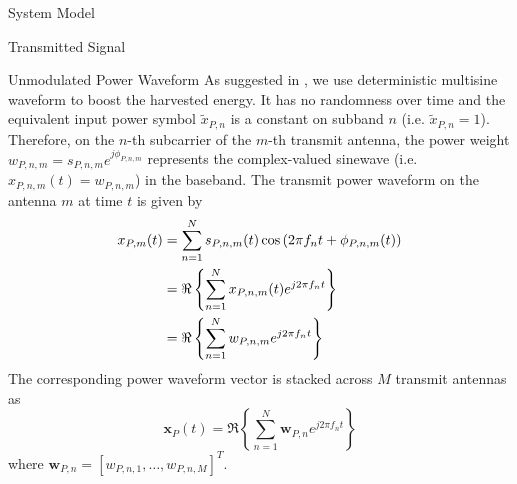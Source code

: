 \documentclass{IEEEtran}
\begin{document}
\begin{section} {System Model}
\begin{subsection} {Transmitted Signal}
            \begin{subsubsection} {Unmodulated Power Waveform}
                As suggested in \cite{Clerckx2018b,Clerckx2016a}, we use deterministic multisine waveform to boost the harvested energy. It has no randomness over time and the equivalent input power symbol $\tilde{x}_{P,n}$ is a constant on subband $n$ (i.e. $\tilde{x}_{P,n} = 1$). Therefore, on the $n$-th subcarrier of the $m$-th transmit antenna, the power weight $w_{P,n,m} = s_{P,n,m} e^{j\phi_{P,n,m}}$ represents the complex-valued sinewave (i.e. $x_{P,n,m}(t) = w_{P,n,m}$) in the baseband. The transmit power waveform on the antenna $m$ at time $t$ is given by
                \begin{equation} \label{eq:x{P,m}(t)}
                    \begin{split}
                        x_{P,m}(t)
                        &= \sum_{n=1}^{N} s_{P,n,m}(t) \cos \left( 2 \pi f_n t + \phi_{P,n,m}(t) \right) \\
                        &= \Re \left\{ \sum_{n=1}^{N} x_{P,n,m}(t) e^{j2 \pi f_n t} \right\} \\
                        &= \Re \left\{ \sum_{n=1}^{N} w_{P,n,m} e^{j2 \pi f_n t} \right\}
                    \end{split}
                \end{equation}
                The corresponding power waveform vector is stacked across $M$ transmit antennas as
                \begin{equation} \label{eq:x_P(t)}
                    \boldsymbol{x}_P(t) = \Re \left\{ \sum_{n=1}^{N} \boldsymbol{w}_{P,n} e^{j2{\pi}{f_n}t} \right\}
                \end{equation}
                where $\boldsymbol{w}_{P,n}=[w_{P,n,1},\dots,w_{P,n,M}]^T$.
            \end{subsubsection}


\end{subsection}
\end{section}
\end{document}
